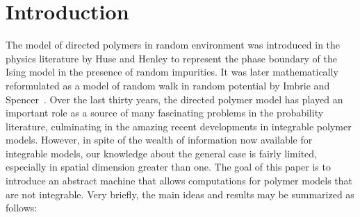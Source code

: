 \documentclass[11pt,reqno]{amsart}
\numberwithin{equation}{section}
\theoremstyle{definition}
\begin{document}
\section{Introduction}
The model of directed polymers in random environment was introduced in the physics literature by Huse and Henley \cite{huse-henley85} to represent the phase boundary of the Ising model in the presence of random impurities. It was later mathematically reformulated as a model of random walk in random potential by Imbrie and Spencer~\cite{imbrie-spencer88}. Over the last thirty years, the directed polymer model has played an important role as a source of many fascinating problems in the probability literature, culminating in the amazing recent developments in integrable polymer models. However, in spite of the wealth of information now available for integrable models, our knowledge about the general case is fairly limited, especially in spatial dimension greater than one. The goal of this paper is to introduce an abstract machine that allows computations for polymer models that are not integrable. Very briefly, the main ideas and results may be summarized as follows:
\end{document}
